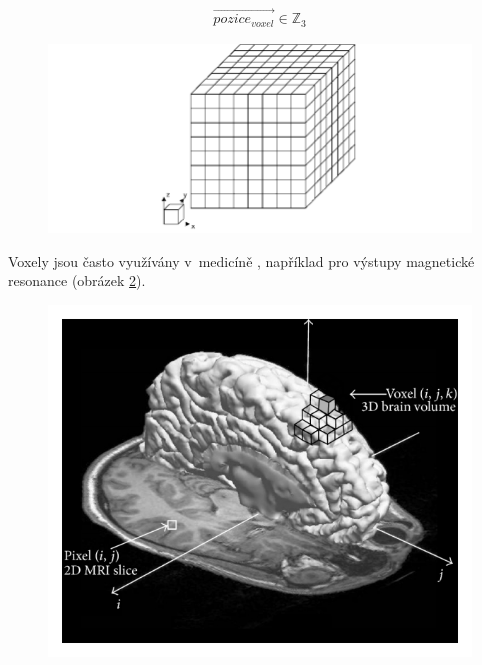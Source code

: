 \begin{equation} \label{eq:voxel_coords}
	\begin{gathered}
		\vec{pozice_{voxel}} \in \mathbb{Z}_3
	\end{gathered}
\end{equation}

\begin{figure}[H]
	\centering
	\includegraphics[scale=0.5]{obrazky-figures/3d_grid.png}
	\captionsetup{justification=centering}
	\label{fig:3d_grid}
\end{figure}

Voxely jsou často využívány v~medicíně \cite{medical_vox}, například pro výstupy magnetické resonance (obrázek \ref{fig:mri_vox}).

\begin{figure}[H]
	\centering
	\includegraphics[scale=1]{obrazky-figures/voxel_mri.png}
	\captionsetup{justification=centering}
	\label{fig:mri_vox}
\end{figure}

